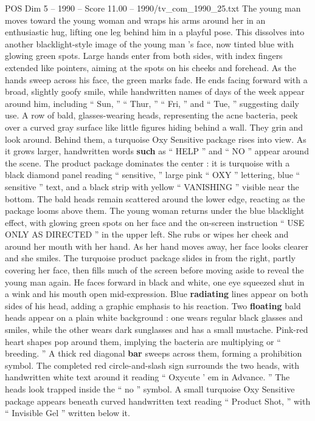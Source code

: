 \begin{textsample}{POS Dim 5 – 1990 – Score 11.00 – 1990/tv\_com\_1990\_25.txt}
The young man moves toward the young woman and wraps his arms around her in an enthusiastic hug, lifting one leg behind him in a playful pose.
This dissolves into another blacklight-style image of the young man ’s face, now tinted blue with glowing green spots.
Large hands enter from both sides, with index fingers extended like pointers, aiming at the spots on his cheeks and forehead.
As the hands sweep across his face, the green marks fade.
He ends facing forward with a broad, slightly goofy smile, while handwritten names of days of the week appear around him, including “ Sun, ” “ Thur, ” “ Fri, ” and “ Tue, ” suggesting daily use.
A row of bald, glasses-wearing heads, representing the acne bacteria, peek over a curved gray surface like little figures hiding behind a wall.
They grin and look around.
Behind them, a turquoise Oxy Sensitive package rises into view.
As it grows larger, handwritten words \textbf{such} as “ HELP ” and “ NO ” appear around the scene.
The product package dominates the center : it is turquoise with a black diamond panel reading “ sensitive, ” large pink “ OXY ” lettering, blue “ sensitive ” text, and a black strip with yellow “ VANISHING ” visible near the bottom.
The bald heads remain scattered around the lower edge, reacting as the package looms above them.
The young woman returns under the blue blacklight effect, with glowing green spots on her face and the on-screen instruction “ USE ONLY AS DIRECTED ” in the upper left.
She rubs or wipes her cheek and around her mouth with her hand.
As her hand moves away, her face looks clearer and she smiles.
The turquoise product package slides in from the right, partly covering her face, then fills much of the screen before moving aside to reveal the young man again.
He faces forward in black and white, one eye squeezed shut in a wink and his mouth open mid-expression.
Blue \textbf{radiating} lines appear on both sides of his head, adding a graphic emphasis to his reaction.
Two \textbf{floating} bald heads appear on a plain white background : one wears regular black glasses and smiles, while the other wears dark sunglasses and has a small mustache.
Pink-red heart shapes pop around them, implying the bacteria are multiplying or “ breeding. ” A thick red diagonal \textbf{bar} sweeps across them, forming a prohibition symbol.
The completed red circle-and-slash sign surrounds the two heads, with handwritten white text around it reading “ Oxycute ’ em in Advance. ” The heads look trapped inside the “ no ” symbol.
A small turquoise Oxy Sensitive package appears beneath curved handwritten text reading “ Product Shot, ” with “ Invisible Gel ” written below it.

\end{textsample}

